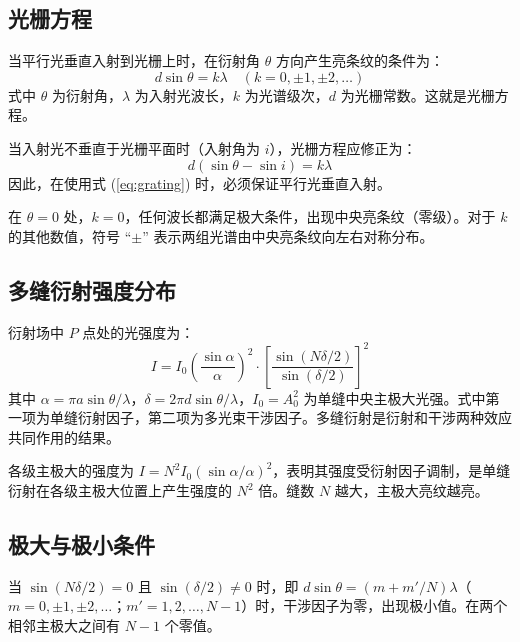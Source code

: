 \documentclass[12pt, a4paper]{article}
\begin{document}
\subsection{光栅方程}

当平行光垂直入射到光栅上时，在衍射角 $\theta$ 方向产生亮条纹的条件为：
\begin{equation}
d \sin\theta = k\lambda \quad (k = 0, \pm 1, \pm 2, \dots)
\label{eq:grating}
\end{equation}
式中 $\theta$ 为衍射角，$\lambda$ 为入射光波长，$k$ 为光谱级次，$d$ 为光栅常数。这就是光栅方程。

当入射光不垂直于光栅平面时（入射角为 $i$），光栅方程应修正为：
\begin{equation}
d(\sin\theta - \sin i) = k\lambda
\label{eq:grating-oblique}
\end{equation}
因此，在使用式 (\ref{eq:grating}) 时，必须保证平行光垂直入射。

在 $\theta = 0$ 处，$k = 0$，任何波长都满足极大条件，出现中央亮条纹（零级）。对于 $k$ 的其他数值，符号 ``$\pm$'' 表示两组光谱由中央亮条纹向左右对称分布。

\subsection{多缝衍射强度分布}

衍射场中 $P$ 点处的光强度为：
\begin{equation}
I = I_0 \left(\frac{\sin\alpha}{\alpha}\right)^2 \cdot \left[\frac{\sin(N\delta/2)}{\sin(\delta/2)}\right]^2
\label{eq:intensity}
\end{equation}
其中 $\alpha = \pi a \sin\theta / \lambda$，$\delta = 2\pi d \sin\theta / \lambda$，$I_0 = A_0^2$ 为单缝中央主极大光强。式中第一项为单缝衍射因子，第二项为多光束干涉因子。多缝衍射是衍射和干涉两种效应共同作用的结果。

各级主极大的强度为 $I = N^2 I_0 (\sin\alpha/\alpha)^2$，表明其强度受衍射因子调制，是单缝衍射在各级主极大位置上产生强度的 $N^2$ 倍。缝数 $N$ 越大，主极大亮纹越亮。

\subsection{极大与极小条件}

当 $\sin(N\delta/2) = 0$ 且 $\sin(\delta/2) \neq 0$ 时，即 $d\sin\theta = (m + m'/N)\lambda$（$m = 0, \pm 1, \pm 2, \dots$；$m' = 1, 2, \dots, N-1$）时，干涉因子为零，出现极小值。在两个相邻主极大之间有 $N-1$ 个零值。
\end{document}
